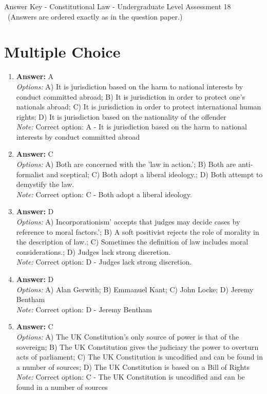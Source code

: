 \documentclass[12pt]{article}
\begin{document}
\begin{center}
Answer Key - Constitutional Law - Undergraduate Level Assessment 18 \
\small (Answers are ordered exactly as in the question paper.)
\end{center}

\section*{Multiple Choice}
\begin{enumerate}[label=\arabic*.]
\item \textbf{Answer:} A
\\ \textit{Options:} A) It is jurisdiction based on the harm to national interests by conduct committed abroad; B) It is jurisdiction in order to protect one's nationals abroad; C) It is jurisdiction in order to protect international human rights; D) It is jurisdiction based on the nationality of the offender
\\ \textit{Note:} Correct option: A - It is jurisdiction based on the harm to national interests by conduct committed abroad
\item \textbf{Answer:} C
\\ \textit{Options:} A) Both are concerned with the 'law in action.'; B) Both are anti-formalist and sceptical; C) Both adopt a liberal ideology.; D) Both attempt to demystify the law.
\\ \textit{Note:} Correct option: C - Both adopt a liberal ideology.
\item \textbf{Answer:} D
\\ \textit{Options:} A) Incorporationism' accepts that judges may decide cases by reference to moral factors.'; B) A soft positivist rejects the role of morality in the description of law.; C) Sometimes the definition of law includes moral considerations.; D) Judges lack strong discretion.
\\ \textit{Note:} Correct option: D - Judges lack strong discretion.
\item \textbf{Answer:} D
\\ \textit{Options:} A) Alan Gerwith; B) Emmanuel Kant; C) John Locke; D) Jeremy Bentham
\\ \textit{Note:} Correct option: D - Jeremy Bentham
\item \textbf{Answer:} C
\\ \textit{Options:} A) The UK Constitution's only source of power is that of the sovereign; B) The UK Constitution gives the judiciary the power to overturn acts of parliament; C) The UK Constitution is uncodified and can be found in a number of sources; D) The UK Constitution is based on a Bill of Rights
\\ \textit{Note:} Correct option: C - The UK Constitution is uncodified and can be found in a number of sources
\end{enumerate}
\end{document}
